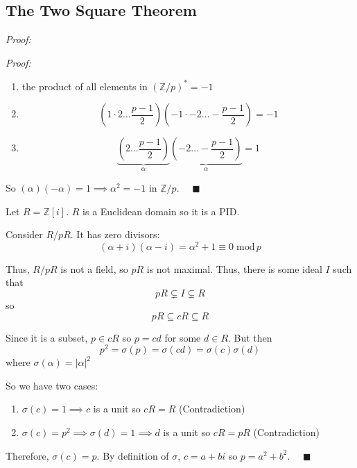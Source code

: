 \documentclass[12pt]{report}
\newcommand{\qed}{\quad \blacksquare}
\newcommand{\Z}{\mathbb{Z}}
\newcommand{\abs}[1]{\left\vert #1 \right\vert}
\renewcommand{\mod}{\; \text{mod}\, }
\newenvironment*{tbox}[3][breakable]{
    \begin{tcolorbox}[
        parbox=false,
        colback=#2!5!white,
        colframe=#2!75!black,
        title={#3},
        #1
    ]}
    {\end{tcolorbox}}
\begin{document}
    \subsection*{The Two Square Theorem}
        \begin{tbox}{gray}{\textbf{Theorem:} if $p$ is a prime with $p \equiv 1\mod 4$, then $p = a^2 + b^2$ for some $a, b \in \Z$}
            \emph{Proof:}

            \begin{tbox}{gray}{\emph{Lemma:} $\alpha^2 + 1 \equiv 0$ for some $\alpha \in \Z/p$}
                \emph{Proof:}
                \begin{enumerate}
                    \item the product of all elements in $(\Z/p)^* = -1$ 
                    \item \[(1 \cdot 2 \dots \frac{p-1}{2})(-1 \cdot -2 \dots -\frac{p-1}{2}) = -1\]
                    \item \[\underbrace{(2 \dots \frac{p-1}{2})}_{\alpha}\underbrace{(-2 \dots -\frac{p-1}{2})}_{\alpha}  =1\]
                \end{enumerate}

                So $(\alpha)(-\alpha) = 1 \implies \alpha^2 = -1$ in $\Z/p$. $\qed$
            \end{tbox}
        
            Let $R = \Z[i]$. $R$ is a Euclidean domain so it is a PID. 
            
            Consider $R/pR$. It has zero divisors:
            \[(\alpha + i)(\alpha - i) = \alpha^2 + 1 \equiv 0 \mod p\]

            Thus, $R/pR$ is not a field, so $pR$ is not maximal. Thus, there is some ideal $I$ such that 
            \[pR \subsetneq I \subsetneq R\]
            so 
            \[pR \subseteq cR \subseteq R \]

            Since it is a subset, $p \in cR$ so $p = cd$ for some $d \in R$. But then 
            \[p^2 = \sigma(p) = \sigma(cd) = \sigma(c) \sigma(d)\]
            where $\sigma(\alpha) = \abs{\alpha}^2$

            So we have two cases:
            \begin{enumerate}
                \item $\sigma(c) = 1 \implies c$ is a unit so $cR = R$ (Contradiction)
                \item $\sigma(c) = p^2 \implies \sigma(d) = 1 \implies d$ is a unit so $cR = pR$ (Contradiction)
            \end{enumerate}

            Therefore, $\sigma(c) = p$. By definition of $\sigma$, $c = a + bi$ so $p = a^2 + b^2$. $\qed$
        \end{tbox}
\end{document}
